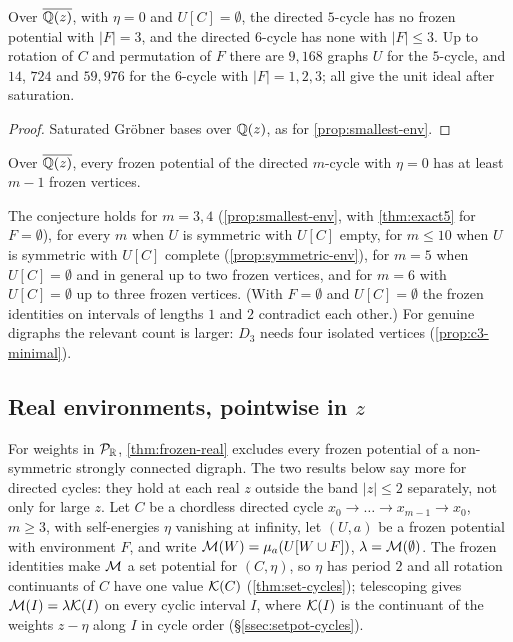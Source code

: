 \begin{proposition}\label{prop:c5c6}
Over $\overline{\mathbb{Q}(z)}$, with $\eta=0$ and $U[C]=\emptyset$, the directed $5$-cycle has no frozen potential with $|F|=3$, and the directed $6$-cycle has none with $|F|\le3$. Up to rotation of $C$ and permutation of $F$ there are $9{,}168$ graphs $U$ for the $5$-cycle, and $14$, $724$ and $59{,}976$ for the $6$-cycle with $|F|=1,2,3$; all give the unit ideal after saturation.
\end{proposition}
\begin{proof}
Saturated Gr\"obner bases over $\mathbb{Q}(z)$, as for \cref{prop:smallest-env}.
\end{proof}

\begin{conjecture}\label{conj:minimal-env}
Over $\overline{\mathbb{Q}(z)}$, every frozen potential of the directed $m$-cycle with $\eta=0$ has at least $m-1$ frozen vertices.
\end{conjecture}

The conjecture holds for $m=3,4$ (\cref{prop:smallest-env}, with \cref{thm:exact5} for $F=\emptyset$), for every $m$ when $U$ is symmetric with $U[C]$ empty, for $m\le10$ when $U$ is symmetric with $U[C]$ complete (\cref{prop:symmetric-env}), for $m=5$ when $U[C]=\emptyset$ and in general up to two frozen vertices, and for $m=6$ with $U[C]=\emptyset$ up to three frozen vertices. (With $F=\emptyset$ and $U[C]=\emptyset$ the frozen identities on intervals of lengths $1$ and $2$ contradict each other.) For genuine digraphs the relevant count is larger: $D_3$ needs four isolated vertices (\cref{prop:c3-minimal}).

\subsection{Real environments, pointwise in \texorpdfstring{$z$}{z}}
For weights in $\mathcal{P}_{\mathbb{R}}$, \cref{thm:frozen-real} excludes every frozen potential of a non-symmetric strongly connected digraph. The two results below say more for directed cycles: they hold at each real $z$ outside the band $|z|\le2$ separately, not only for large $z$. Let $C$ be a chordless directed cycle $x_0\to\dots\to x_{m-1}\to x_0$, $m\ge3$, with self-energies $\eta$ vanishing at infinity, let $(U,a)$ be a frozen potential with environment $F$, and write $\mathcal{M}(W)=\mu_a(U[W\cup F])$, $\lambda=\mathcal{M}(\emptyset)$. The frozen identities make $\mathcal{M}$ a set potential for $(C,\eta)$, so $\eta$ has period $2$ and all rotation continuants of $C$ have one value $\mathcal{K}(C)$ (\cref{thm:set-cycles}); telescoping gives $\mathcal{M}(I)=\lambda\mathcal{K}(I)$ on every cyclic interval $I$, where $\mathcal{K}(I)$ is the continuant of the weights $z-\eta$ along $I$ in cycle order (\S\ref{ssec:setpot-cycles}).

